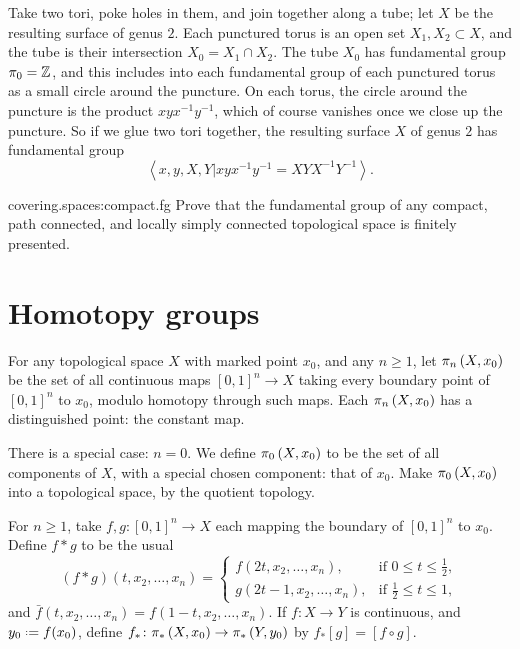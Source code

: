
\begin{example}
Take two tori, poke holes in them, and join together along a tube; let \(X\) be the resulting surface of genus \(2\).
Each punctured torus is an open set \(X_1, X_2 \subset X\), and the tube is their intersection \(X_0=X_1 \cap X_2\).
The tube \(X_0\) has fundamental group \(\pi_0=\mathbb{Z}^{}\), and this includes into each fundamental group of each punctured torus as a small circle around the puncture.
On each torus, the circle around the puncture is the product \(xyx^{-1}y^{-1}\), which of course vanishes once we close up the puncture.
So if we glue two tori together, the resulting surface \(X\) of genus \(2\) has fundamental group 
\[
\left<x,y,X,Y|xyx^{-1}y^{-1}=XYX^{-1}Y^{-1}\right>.
\]
\end{example}
\begin{problem}{covering.spaces:compact.fg}
Prove that the fundamental group of any compact, path connected, and locally simply connected topological space is finitely presented.
\end{problem}


\section{Homotopy groups}
For any topological space \(X\) with marked point \(x_0\), and any \(n\ge 1\), let \(\pi_{n}\left(X,x_0\right)\) be the set of all continuous maps \([0,1]^n \to X\) taking every boundary point of \([0,1]^n\) to \(x_0\), modulo homotopy through such maps.
Each \(\pi_{n}\left(X,x_0\right)\) has a distinguished point: the constant map.

There is a special case: \(n=0\).
We define \(\pi_{0}\left(X,x_0\right)\) to be the set of all components of \(X\), with a special chosen component: that of \(x_0\).
Make \(\pi_{0}\left(X,x_0\right)\) into a topological space, by the quotient topology.

For \(n\ge 1\), take \(f,g \colon [0,1]^n \to X\) each mapping the boundary of \([0,1]^n\) to \(x_0\).
Define \(f*g\) to be the usual 
\[
(f*g)(t,x_2,\dots,x_n) =
\begin{cases}
f(2t,x_2,\dots,x_n), & \text{if \(0 \le t\le \frac{1}{2}\)}, \\
g(2t-1,x_2,\dots,x_n), & \text{if \(\frac{1}{2} \le t\le 1\)},
\end{cases}
\]
and \(\bar{f}(t,x_2,\dots,x_n)=f(1-t,x_2,\dots,x_n)\).
If \(f \colon X \to Y\) is continuous, and \(y_0\defeq f(x_0)\), define \(f_* \colon \pi_{*}\left(X,x_0\right) \to \pi_{*}\left(Y,y_0\right)\) by \(f_*[g] = [f \circ g]\).

